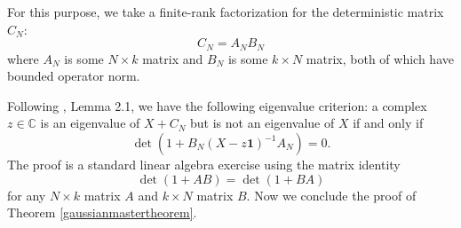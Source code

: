 \documentclass[11pt,reqno]{amsart}
\theoremstyle{plain}
\theoremstyle{remark}
\numberwithin{equation}{section}
\begin{document}
For this purpose, we take a finite-rank factorization for the deterministic matrix $C_N$: 
$$C_N=A_NB_N$$
where $A_N$ is some $N\times k$ matrix and $B_N$ is some $k\times N$ matrix, both of which have bounded operator norm.

Following \cite{tao2013outliers}, Lemma 2.1, we have the following eigenvalue criterion: a complex $z\in\mathbb{C}$ is an eigenvalue of $X+C_N$ but is not an eigenvalue of $X$ if and only if 
\begin{equation}
\det(1+B_N(X-z\mathbf{1})^{-1}A_N)=0.
\end{equation}
The proof is a standard linear algebra exercise using the matrix identity 
\begin{equation}\label{matrixidentity}\det(1+AB)=\det(1+BA)\end{equation}
for any $N\times k$ matrix $A$ and $k\times N$ matrix $B$.
Now we conclude the proof of Theorem \ref{gaussianmastertheorem}.
\end{document}
